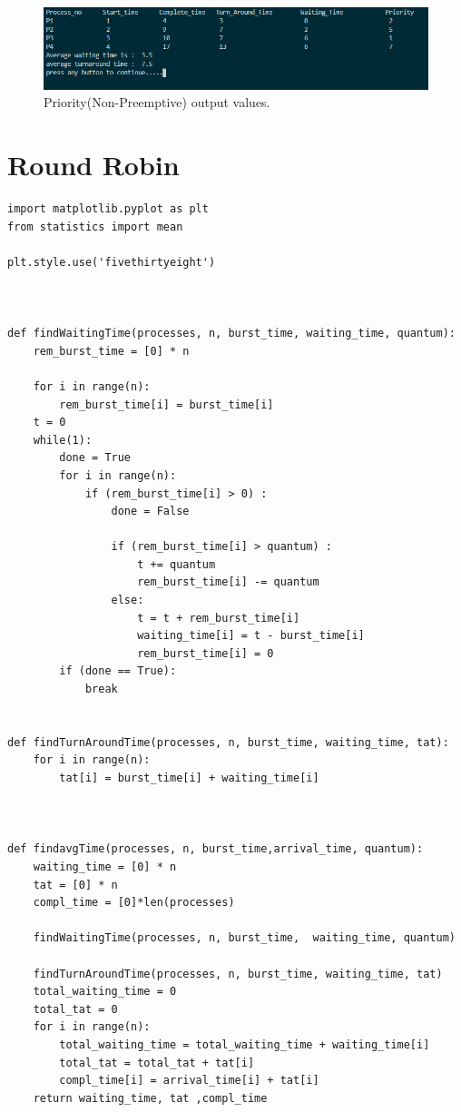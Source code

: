 \documentclass[11pt,a4paper]{report}
\begin{document}
{\begin{figure}[H]
	\centering
	\includegraphics[scale=0.75]{./img/priority_np_out.PNG}
	\caption{Priority(Non-Preemptive) output values.}
\end{figure}}

\chapter{Round Robin}
\begin{lstlisting}[columns=fullflexible,caption = Round Robin Source Code,breaklines=true,postbreak=\mbox{\textcolor{red}{$\hookrightarrow$}\space},]
import matplotlib.pyplot as plt
from statistics import mean

plt.style.use('fivethirtyeight')



def findWaitingTime(processes, n, burst_time, waiting_time, quantum):  
    rem_burst_time = [0] * n 

    for i in range(n):  
        rem_burst_time[i] = burst_time[i] 
    t = 0
    while(1): 
        done = True
        for i in range(n): 
            if (rem_burst_time[i] > 0) : 
                done = False 
                  
                if (rem_burst_time[i] > quantum) : 
                    t += quantum  
                    rem_burst_time[i] -= quantum  
                else: 
                    t = t + rem_burst_time[i]  
                    waiting_time[i] = t - burst_time[i]  
                    rem_burst_time[i] = 0
        if (done == True): 
            break
              

def findTurnAroundTime(processes, n, burst_time, waiting_time, tat): 
    for i in range(n): 
        tat[i] = burst_time[i] + waiting_time[i]  
  
  

def findavgTime(processes, n, burst_time,arrival_time, quantum):  
    waiting_time = [0] * n 
    tat = [0] * n  
    compl_time = [0]*len(processes)

    findWaitingTime(processes, n, burst_time,  waiting_time, quantum)  

    findTurnAroundTime(processes, n, burst_time, waiting_time, tat)    
    total_waiting_time = 0
    total_tat = 0
    for i in range(n): 
        total_waiting_time = total_waiting_time + waiting_time[i]  
        total_tat = total_tat + tat[i]  
        compl_time[i] = arrival_time[i] + tat[i]
    return waiting_time, tat ,compl_time
      



\end{lstlisting}
\end{document}
